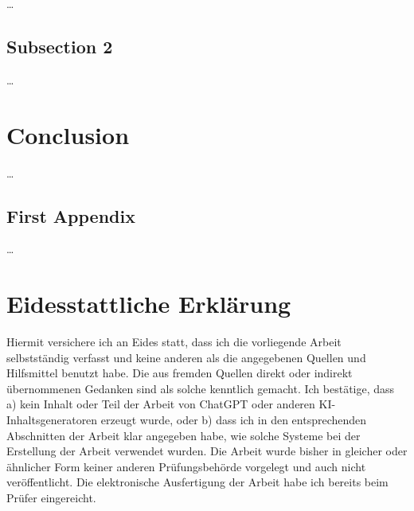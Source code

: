 \dots

\section{Subsection 2}
\label{ch:discussion:sec:subsection2}

\dots

\chapter{Conclusion}
\label{ch:conclusion}

\dots


{}

{}	%
{}	%

\pagebreak





\pagebreak
\appendix

{}	%
{}	%


\section{First Appendix}   %
\label{AppendixA}  
\setcounter{figure}{0}

\dots


\pagebreak


\chapter*{Eidesstattliche Erklärung}
\label{ch:Declaration}

Hiermit versichere ich an Eides statt, dass ich die vorliegende Arbeit selbstständig verfasst und keine anderen als die angegebenen Quellen und Hilfsmittel benutzt habe. Die aus fremden Quellen direkt oder indirekt übernommenen Gedanken sind als solche kenntlich gemacht. Ich bestätige, dass a) kein Inhalt oder Teil der Arbeit von ChatGPT oder anderen KI-Inhaltsgeneratoren erzeugt wurde, oder b) dass ich in den entsprechenden Abschnitten der Arbeit klar angegeben habe, wie solche Systeme bei der Erstellung der Arbeit verwendet wurden. Die Arbeit wurde bisher in gleicher oder ähnlicher Form keiner anderen Prüfungsbehörde vorgelegt und auch nicht veröffentlicht. Die elektronische Ausfertigung der Arbeit habe ich bereits beim Prüfer eingereicht.


